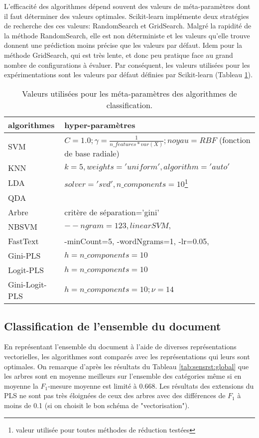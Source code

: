 L'efficacité des algorithmes dépend souvent des valeurs de méta-paramètres dont il faut déterminer des valeurs optimales. Scikit-learn implémente deux stratégies de recherche des ces valeurs: RandomSearch et GridSearch. Malgré la rapidité de la méthode RandomSearch, elle est non déterministe et les valeurs qu'elle trouve donnent une prédiction moins précise que les valeurs par défaut. Idem pour la méthode GridSearch, qui est très lente, et donc peu pratique face au grand nombre de configurations à évaluer. Par conséquent, les valeurs utilisées pour les expérimentations sont les valeurs par défaut définies par Scikit-learn (Tableau \ref{tab:sensrst:metapara}).

\begin{table}[htb]
	\scriptsize
	\centering
	\begin{tabular}{|l|p{}|}
		\hline
		algorithmes & hyper-paramètres\\ \hline
		SVM & $C=1.0; \gamma=\frac{1}{n\_features * var(X)}; noyau=RBF$ (fonction de base radiale)\\ \hline
		KNN & $k = 5, weights='uniform', algorithm='auto'$ \\ \hline
		LDA &  $solver='svd', n\_components=10$\footnote{valeur utilisée pour toutes méthodes de réduction testées}  \\ \hline
		QDA &   \\ \hline
		Arbre & critère de séparation='gini' \\ \hline
		NBSVM & $--ngram=123, linearSVM, $ \\ \hline
		FastText & -minCount=5, -wordNgrams=1, -lr=0.05,    \\ \hline
		Gini-PLS & $h=n\_components=10$ \\ \hline
		Logit-PLS & $h=n\_components=10$  \\ \hline
		Gini-Logit-PLS & $h=n\_components=10; \nu = 14$ \\ \hline
	\end{tabular}
	\caption{Valeurs utilisées pour les méta-paramètres des algorithmes de classification.}\label{tab:sensrst:metapara}
\end{table}

%
\subsection{Classification de l'ensemble du document}

En représentant l'ensemble du document à l'aide de diverses représentations vectorielles, les algorithmes sont comparés avec les représentations qui leurs sont optimales. On remarque d'après les résultats du Tableau \ref{tab:sensrst:global} que les arbres sont en moyenne meilleurs sur l'ensemble des catégories même si en moyenne la $F_1$-mesure moyenne est limité à 0.668. Les résultats des extensions du PLS ne sont pas très éloignées de ceux des arbres avec des différences de $F_1$ à moins de 0.1 (si on choisit le bon schéma de "vectorisation").

